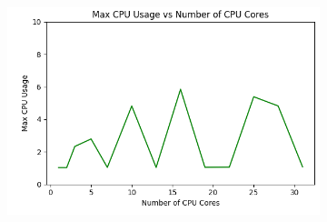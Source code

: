 \documentclass[times, 10pt,twocolumn]{article}
\begin{document}
\begin{figure}[ht]
\begin{subfigure}[b]{0.3\textwidth}
      \includegraphics[width=\textwidth]{imgs/study_1_results/var_cpu/imageprocess/CPU_CPUUsage.png}
     \caption{}
     \label{fig:plot6}
   \end{subfigure}
   

\end{figure}
\end{document}
